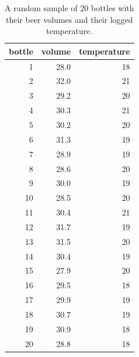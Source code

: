 \documentclass[]{report}\usepackage[]{graphicx}\usepackage[]{color}
\begin{document}
\begin{table}[ht]
\centering
\caption{A random sample of 20 bottles with their beer volumes and their logged temperature.} 
\label{tab:samplesize20}
\begin{tabular}{rrr}
  \hline
bottle & volume & temperature \\ 
  \hline
 1 & 28.0 & 18 \\ 
   2 & 32.0 & 21 \\ 
   3 & 29.2 & 20 \\ 
   4 & 30.3 & 21 \\ 
   5 & 30.2 & 20 \\ 
   6 & 31.3 & 19 \\ 
   7 & 28.9 & 19 \\ 
   8 & 28.6 & 20 \\ 
   9 & 30.0 & 19 \\ 
  10 & 28.5 & 20 \\ 
  11 & 30.4 & 21 \\ 
  12 & 31.7 & 19 \\ 
  13 & 31.5 & 20 \\ 
  14 & 30.4 & 19 \\ 
  15 & 27.9 & 20 \\ 
  16 & 29.5 & 18 \\ 
  17 & 29.9 & 19 \\ 
  18 & 30.7 & 19 \\ 
  19 & 30.9 & 18 \\ 
  20 & 28.8 & 18 \\ 
   \hline
\end{tabular}
\end{table}
\end{document}
